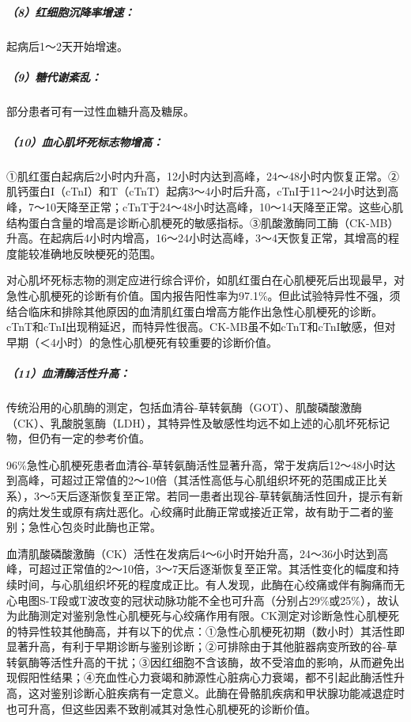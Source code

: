 \subparagraph{（8）红细胞沉降率增速：}

起病后1～2天开始增速。

\subparagraph{（9）糖代谢紊乱：}

部分患者可有一过性血糖升高及糖尿。

\subparagraph{（10）血心肌坏死标志物增高：}

①肌红蛋白起病后2小时内升高，12小时内达到高峰，24～48小时内恢复正常。②肌钙蛋白I（cTnI）和T（cTnT）起病3～4小时后升高，cTnI于11～24小时达到高峰，7～10天降至正常；cTnT于24～48小时达高峰，10～14天降至正常。这些心肌结构蛋白含量的增高是诊断心肌梗死的敏感指标。③肌酸激酶同工酶（CK-MB）升高。在起病后4小时内增高，16～24小时达高峰，3～4天恢复正常，其增高的程度能较准确地反映梗死的范围。

对心肌坏死标志物的测定应进行综合评价，如肌红蛋白在心肌梗死后出现最早，对急性心肌梗死的诊断有价值。国内报告阳性率为97.1\%。但此试验特异性不强，须结合临床和排除其他原因的血清肌红蛋白增高方能作出急性心肌梗死的诊断。cTnT和cTnI出现稍延迟，而特异性很高。CK-MB虽不如cTnT和cTnI敏感，但对早期（＜4小时）的急性心肌梗死有较重要的诊断价值。

\subparagraph{（11）血清酶活性升高：}

传统沿用的心肌酶的测定，包括血清谷-草转氨酶（GOT）、肌酸磷酸激酶（CK）、乳酸脱氢酶（LDH），其特异性及敏感性均远不如上述的心肌坏死标记物，但仍有一定的参考价值。

96\%急性心肌梗死患者血清谷-草转氨酶活性显著升高，常于发病后12～48小时达到高峰，可超过正常值的2～10倍（其活性高低与心肌组织坏死的范围成正比关系），3～5天后逐渐恢复至正常。若同一患者出现谷-草转氨酶活性回升，提示有新的病灶发生或原有病灶恶化。心绞痛时此酶正常或接近正常，故有助于二者的鉴别；急性心包炎时此酶也正常。

血清肌酸磷酸激酶（CK）活性在发病后4～6小时开始升高，24～36小时达到高峰，可超过正常值的2～10倍，3～7天后逐渐恢复至正常。其活性变化的幅度和持续时间，与心肌组织坏死的程度成正比。有人发现，此酶在心绞痛或伴有胸痛而无心电图S-T段或T波改变的冠状动脉功能不全也可升高（分别占29\%或25\%），故认为此酶测定对鉴别急性心肌梗死与心绞痛作用有限。CK测定对诊断急性心肌梗死的特异性较其他酶高，并有以下的优点：①急性心肌梗死初期（数小时）其活性即显著升高，有利于早期诊断与鉴别诊断；②可排除由于其他脏器病变所致的谷-草转氨酶等活性升高的干扰；③因红细胞不含该酶，故不受溶血的影响，从而避免出现假阳性结果；④充血性心力衰竭和肺源性心脏病心力衰竭，都不引起此酶活性升高，这对鉴别诊断心脏疾病有一定意义。此酶在骨骼肌疾病和甲状腺功能减退症时也可升高，但这些因素不致削减其对急性心肌梗死的诊断价值。

